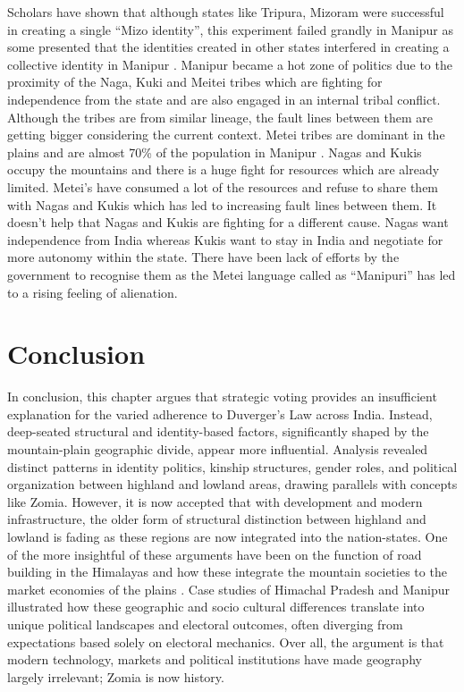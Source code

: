 Scholars have shown that although states like Tripura, Mizoram were successful in creating a single \enquote{Mizo identity}, this experiment failed grandly in Manipur as some presented that the identities created in other states interfered in creating a collective identity in Manipur \citep{hassan2007state}.   Manipur became a hot zone of politics due to the proximity of the Naga, Kuki and Meitei tribes which are fighting for independence from the state and are also engaged in an internal tribal conflict. Although the tribes are from similar lineage, the fault lines between them are getting bigger considering the current context. Metei tribes are dominant in the plains and are almost 70\% of the population in Manipur \citep{arora2012politics}. Nagas and Kukis occupy the mountains and there is a huge fight for resources which are already limited. Metei’s have consumed a lot of the resources and refuse to share them with Nagas and Kukis which has led to increasing fault lines between them. It doesn't help that Nagas and Kukis are fighting for a different cause. Nagas want independence from India whereas Kukis want to stay in India and negotiate for more autonomy within the state. There have been lack of efforts by the government to recognise them as the Metei language called as \enquote{Manipuri} has led to a rising feeling of alienation.

\section{Conclusion}

In conclusion, this chapter argues that strategic voting provides an insufficient explanation for the varied adherence to Duverger's Law across India. Instead, deep-seated structural and identity-based factors, significantly shaped by the mountain-plain geographic divide, appear more influential. Analysis revealed distinct patterns in identity politics, kinship structures, gender roles, and political organization between highland and lowland areas, drawing parallels with concepts like Zomia. However, it is now accepted that with development and modern infrastructure, the older form of structural distinction between highland and lowland is fading as these regions are now integrated into the nation-states. One of the more insightful of these arguments have been on the function of road building in the Himalayas and how these integrate the mountain societies to the market economies of the plains \citep{murton2013himalayan}.
Case studies of Himachal Pradesh and Manipur illustrated how these geographic and socio cultural differences translate into unique political landscapes and electoral outcomes, often diverging from expectations based solely on electoral mechanics. Over all, the argument is that modern technology, markets and political institutions have made geography largely irrelevant; Zomia is now history. 

